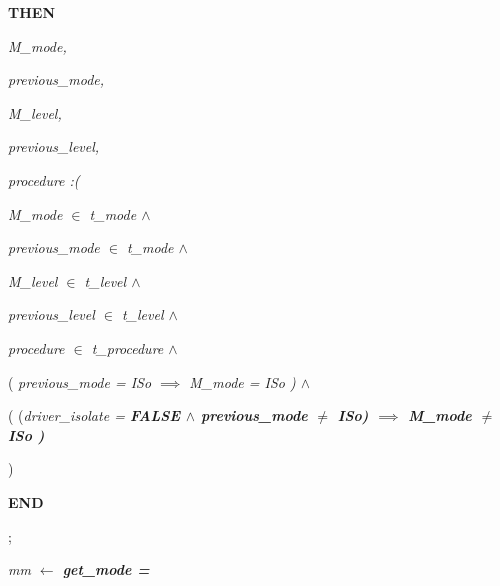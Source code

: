 \documentclass[11pt]{article}
\begin{document}
\begin{sloppypar}
\hspace*{0.20in}\bf THEN

\hspace*{0.40in}\it M\_mode\rm ,

\hspace*{0.40in}\it previous\_mode\rm ,

\hspace*{0.40in}\it M\_level\rm ,

\hspace*{0.40in}\it previous\_level\rm ,

\hspace*{0.40in}\it procedure \rm :\rm (

\hspace*{0.60in}\it M\_mode  $\in$  \it t\_mode  $\land$ 

\hspace*{0.60in}\it previous\_mode  $\in$  \it t\_mode  $\land$ 

\hspace*{0.60in}\it M\_level  $\in$  \it t\_level  $\land$ 

\hspace*{0.60in}\it previous\_level  $\in$  \it t\_level  $\land$ 

\hspace*{0.60in}\it procedure  $\in$  \it t\_procedure  $\land$ 

\hspace*{0.60in}\rm ( \it previous\_mode \rm = \it ISo  $\implies$  \it M\_mode \rm = \it ISo \rm )\hspace*{0.25in} $\land$ 

\hspace*{0.60in}\hspace*{0.60in}\hspace*{0.60in}\rm ( \rm (\it driver\_isolate \rm = \bf FALSE  $\land$  \it previous\_mode  $\not =$  \it ISo\rm )  $\implies$ \hspace*{0.10in}\it M\_mode  $\not =$  \it ISo \rm )

\hspace*{0.35in}

\hspace*{0.60in}\rm )

\hspace*{0.40in}\bf END

\hspace*{0.40in}

\hspace*{0.20in}\rm ; 

\hspace*{0.20in}\it mm  $\leftarrow$ \hspace*{0.15in}\bf get\_mode \rm = 


\end{sloppypar}
\end{document}
